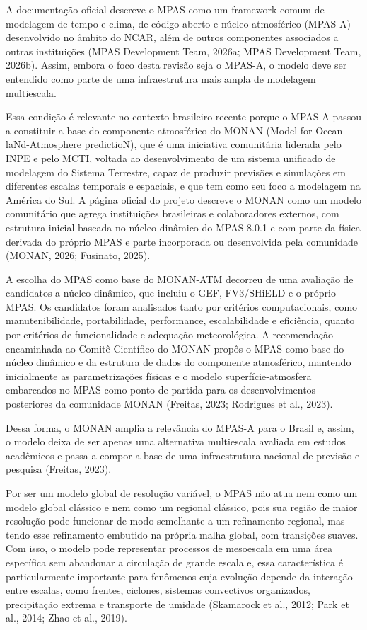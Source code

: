 \documentclass[12pt,a4paper,oneside]{book}
\begin{document}
A documentação oficial descreve o MPAS como um framework comum de modelagem de tempo e clima, de código aberto e núcleo atmosférico (MPAS-A) desenvolvido no âmbito do NCAR, além de outros componentes associados a outras instituições (MPAS Development Team, 2026a; MPAS Development Team, 2026b). Assim, embora o foco desta revisão seja o MPAS-A, o modelo deve ser entendido como parte de uma infraestrutura mais ampla de modelagem multiescala.

Essa condição é relevante no contexto brasileiro recente porque o MPAS-A passou a constituir a base do componente atmosférico do MONAN (Model for Ocean-laNd-Atmosphere predictioN), que é uma iniciativa comunitária liderada pelo INPE e pelo MCTI, voltada ao desenvolvimento de um sistema unificado de modelagem do Sistema Terrestre, capaz de produzir previsões e simulações em diferentes escalas temporais e espaciais, e que tem como seu foco a modelagem na América do Sul. A página oficial do projeto descreve o MONAN como um modelo comunitário que agrega instituições brasileiras e colaboradores externos, com estrutura inicial baseada no núcleo dinâmico do MPAS 8.0.1 e com parte da física derivada do próprio MPAS e parte incorporada ou desenvolvida pela comunidade (MONAN, 2026; Fusinato, 2025).

A escolha do MPAS como base do MONAN-ATM decorreu de uma avaliação de candidatos a núcleo dinâmico, que incluiu o GEF, FV3/SHiELD e o próprio MPAS. Os candidatos foram analisados tanto por critérios computacionais, como manutenibilidade, portabilidade, performance, escalabilidade e eficiência, quanto por critérios de funcionalidade e adequação meteorológica. A recomendação encaminhada ao Comitê Científico do MONAN propôs o MPAS como base do núcleo dinâmico e da estrutura de dados do componente atmosférico, mantendo inicialmente as parametrizações físicas e o modelo superfície-atmosfera embarcados no MPAS como ponto de partida para os desenvolvimentos posteriores da comunidade MONAN (Freitas, 2023; Rodrigues et al., 2023).

Dessa forma, o MONAN amplia a relevância do MPAS-A para o Brasil e, assim, o modelo deixa de ser apenas uma alternativa multiescala avaliada em estudos acadêmicos e passa a compor a base de uma infraestrutura nacional de previsão e pesquisa (Freitas, 2023).

Por ser um modelo global de resolução variável, o MPAS não atua nem como um modelo global clássico e nem como um regional clássico, pois sua região de maior resolução pode funcionar de modo semelhante a um refinamento regional, mas tendo esse refinamento embutido na própria malha global, com transições suaves. Com isso, o modelo pode representar processos de mesoescala em uma área específica sem abandonar a circulação de grande escala e, essa característica é particularmente importante para fenômenos cuja evolução depende da interação entre escalas, como frentes, ciclones, sistemas convectivos organizados, precipitação extrema e transporte de umidade (Skamarock et al., 2012; Park et al., 2014; Zhao et al., 2019).
\end{document}
